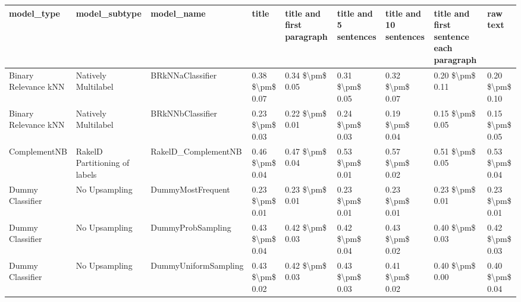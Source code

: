 \begin{tabular}{lllllllll}
\toprule
                     model\_type &                 model\_subtype &                                   model\_name &           title & title and first paragraph & title and 5 sentences & title and 10 sentences & title and first sentence each paragraph &            raw text \\
\midrule
           Binary Relevance kNN &           Natively Multilabel &                             BRkNNaClassifier & 0.38 \$\textbackslash pm\$ 0.07 &           0.34 \$\textbackslash pm\$ 0.05 &       0.31 \$\textbackslash pm\$ 0.05 &        0.32 \$\textbackslash pm\$ 0.07 &                         0.20 \$\textbackslash pm\$ 0.11 &     0.20 \$\textbackslash pm\$ 0.10 \\
           Binary Relevance kNN &           Natively Multilabel &                             BRkNNbClassifier & 0.23 \$\textbackslash pm\$ 0.03 &           0.22 \$\textbackslash pm\$ 0.01 &       0.24 \$\textbackslash pm\$ 0.03 &        0.19 \$\textbackslash pm\$ 0.04 &                         0.15 \$\textbackslash pm\$ 0.05 &     0.15 \$\textbackslash pm\$ 0.05 \\
                   ComplementNB & RakelD Partitioning of labels &                          RakelD\_ComplementNB & 0.46 \$\textbackslash pm\$ 0.04 &           0.47 \$\textbackslash pm\$ 0.04 &       0.53 \$\textbackslash pm\$ 0.01 &        0.57 \$\textbackslash pm\$ 0.02 &                         0.51 \$\textbackslash pm\$ 0.05 &     0.53 \$\textbackslash pm\$ 0.04 \\
               Dummy Classifier &                 No Upsampling &                            DummyMostFrequent & 0.23 \$\textbackslash pm\$ 0.01 &           0.23 \$\textbackslash pm\$ 0.01 &       0.23 \$\textbackslash pm\$ 0.01 &        0.23 \$\textbackslash pm\$ 0.01 &                         0.23 \$\textbackslash pm\$ 0.01 &     0.23 \$\textbackslash pm\$ 0.01 \\
               Dummy Classifier &                 No Upsampling &                            DummyProbSampling & 0.43 \$\textbackslash pm\$ 0.04 &           0.42 \$\textbackslash pm\$ 0.03 &       0.42 \$\textbackslash pm\$ 0.04 &        0.43 \$\textbackslash pm\$ 0.02 &                         0.40 \$\textbackslash pm\$ 0.03 &     0.42 \$\textbackslash pm\$ 0.03 \\
               Dummy Classifier &                 No Upsampling &                         DummyUniformSampling & 0.43 \$\textbackslash pm\$ 0.02 &           0.42 \$\textbackslash pm\$ 0.03 &       0.43 \$\textbackslash pm\$ 0.03 &        0.41 \$\textbackslash pm\$ 0.02 &                         0.40 \$\textbackslash pm\$ 0.00 &     0.40 \$\textbackslash pm\$ 0.04 \\

\end{tabular}
